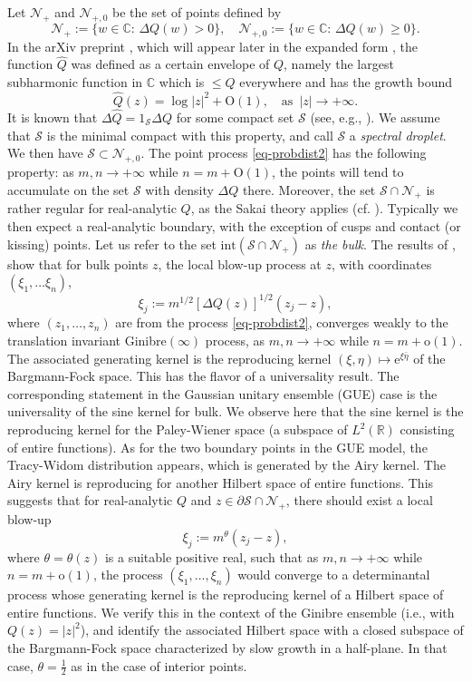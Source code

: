 \documentclass{birkart}
\theoremstyle{definition}
\theoremstyle{remark}
\numberwithin{equation}{section}
\numberwithin{figure}{section}
\newcommand{\e}{\mathrm e}
\newcommand{\1}{{\mathbf 1}}
\newcommand{\C}{{\mathbb C}}
\newcommand{\R}{{\mathbb R}}
\newcommand{\ordo}{\mathrm{o}}
\newcommand{\Ordo}{\mathrm{O}}
\begin{document}
Let $\mathcal{N}_+$ and $\mathcal{N}_{+,0}$ be the set of points defined by
\[
\mathcal{N}_+:=\big\{w\in\C:\,\Delta Q(w)>0\big\},\quad
\mathcal{N}_{+,0}:=\big\{w\in\C:\,\Delta Q(w)\ge0\big\}.
\]
In the arXiv preprint \cite{HedMak1}, which will appear later in the expanded 
form \cite{HedMak2}, the function $\widehat{Q}$ was defined as a certain 
envelope of $Q$, namely the largest subharmonic function in $\C$ which is 
$\le Q$ everywhere and has the growth bound  
\[
\widehat{Q}(z)=\log|z|^2+\Ordo(1),\quad\text{as}\,\,\,|z|\to+\infty.
\]
It is known that $\Delta \widehat{Q}=1_{\mathcal S}\Delta Q$ for some 
compact set $\mathcal S$ (see, e.g., \cite{HedMak2}). We assume that 
$\mathcal S$ is the minimal compact with this property, and call 
$\mathcal S$ a {\em spectral droplet}. We then have 
$\mathcal{S}\subset \mathcal{N}_{+,0}$.
The point process \eqref{eq-probdist2} has the following property: as 
$m,n\to+\infty$ while $n=m+\Ordo(1)$, the points will tend to accumulate on 
the set $\mathcal{S}$ with density $\Delta Q$ there. Moreover, the set
$\mathcal{S}\cap\mathcal{N}_+$ is rather regular for real-analytic $Q$, as
the Sakai theory applies (cf. \cite{HedShi}). Typically we then expect a
real-analytic boundary, with the exception of cusps and contact (or kissing) 
points. Let us refer to the set
$\mathrm{int}(\mathcal{S}\cap\mathcal{N}_{+})$ as {\em the bulk}. The results 
of \cite{ahm1}, \cite{ahm2} show that for bulk points
$z$, the local blow-up process at $z$, with coordinates $(\xi_1,\ldots\xi_n)$, 
\[
\xi_j:=m^{1/2}[\Delta Q(z)]^{1/2}(z_j-z),
\]
where $(z_1,\ldots,z_n)$ are from the process \eqref{eq-probdist2}, 
converges weakly to the translation invariant Ginibre$(\infty)$
process, as $m,n\to+\infty$ while $n=m+\ordo(1)$. 
The associated generating kernel is the reproducing kernel 
$(\xi,\eta)\mapsto\e^{\xi\bar\eta}$ of the 
Bargmann-Fock space. 
This has the flavor of a universality result.
The corresponding statement in the Gaussian unitary ensemble 
(GUE) case is the universality of the sine kernel for bulk. We observe here 
that the sine kernel is the reproducing kernel for the Paley-Wiener space 
(a subspace of $L^2(\R)$ consisting of entire functions). 
As for the two boundary points in the GUE model, the Tracy-Widom distribution 
appears, which is generated by the Airy kernel. The Airy kernel is 
reproducing for another Hilbert space of entire functions.   
This suggests that for real-analytic $Q$ and $z\in\partial\mathcal{S}\cap
\mathcal{N}_+$, there should exist a local blow-up 
\[
\xi_j:=m^\theta(z_j-z),
\]
where $\theta=\theta(z)$ is a suitable positive real, such that as 
$m,n\to+\infty$ while $n=m+\ordo(1)$, the process $(\xi_1,\ldots,\xi_n)$
would converge to a determinantal process whose generating kernel is the
reproducing kernel of a Hilbert space of entire functions.   
We verify this in the context of the Ginibre ensemble (i.e., with 
$Q(z)=|z|^2$), and identify the associated Hilbert space with a closed 
subspace of the Bargmann-Fock space characterized by slow growth in a 
half-plane. In that case, $\theta=\frac12$ as in the case of interior points. 
\medskip
\end{document}
